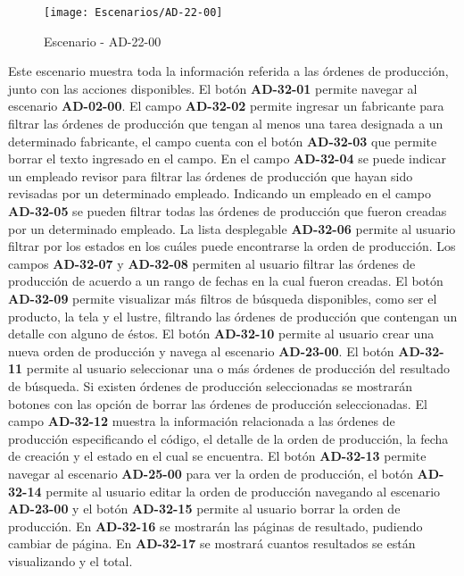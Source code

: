 \begin{figure}[H]
\centering
\texttt{[image: Escenarios/AD-22-00]}
\caption{Escenario - AD-22-00}
\label{fig:AD-22-00}
\end{figure}

Este escenario muestra toda la información referida a las órdenes de producción, junto con las acciones disponibles.
El botón \textbf{AD-32-01} permite navegar al escenario \textbf{AD-02-00}. El campo \textbf{AD-32-02} permite ingresar un fabricante para filtrar las órdenes de producción que tengan al menos una tarea designada a un determinado fabricante, el campo cuenta con el botón \textbf{AD-32-03} que permite borrar el texto ingresado en el campo. En el campo \textbf{AD-32-04} se puede indicar un empleado revisor para filtrar las órdenes de producción que hayan sido revisadas por un determinado empleado. Indicando un empleado en el campo \textbf{AD-32-05} se pueden filtrar todas las órdenes de producción que fueron creadas por un determinado empleado. La lista desplegable \textbf{AD-32-06} permite al usuario filtrar por los estados en los cuáles puede encontrarse la orden de producción. Los campos  \textbf{AD-32-07} y \textbf{AD-32-08} permiten al usuario filtrar las órdenes de producción de acuerdo a un rango de fechas en la cual fueron creadas. El botón \textbf{AD-32-09} permite visualizar más filtros de búsqueda disponibles, como ser el producto, la tela y el lustre, filtrando las órdenes de producción que contengan un detalle con alguno de éstos.
El botón \textbf{AD-32-10} permite al usuario crear una nueva orden de producción y navega al escenario \textbf{AD-23-00}.
El botón \textbf{AD-32-11} permite al usuario seleccionar una o más órdenes de producción del resultado de búsqueda. Si existen órdenes de producción seleccionadas se mostrarán botones con las opción de borrar las órdenes de producción seleccionadas. El campo \textbf{AD-32-12} muestra la información relacionada a las órdenes de producción especificando el código, el detalle de la orden de producción, la fecha de creación y el estado en el cual se encuentra. El botón \textbf{AD-32-13} permite navegar al escenario \textbf{AD-25-00} para ver la orden de producción, el botón \textbf{AD-32-14} permite al usuario editar la orden de producción navegando al escenario \textbf{AD-23-00} y el botón \textbf{AD-32-15} permite al usuario borrar la orden de producción. 
En \textbf{AD-32-16} se mostrarán las páginas de resultado, pudiendo cambiar de página. En \textbf{AD-32-17} se mostrará cuantos resultados se están visualizando y el total.
\clearpage
